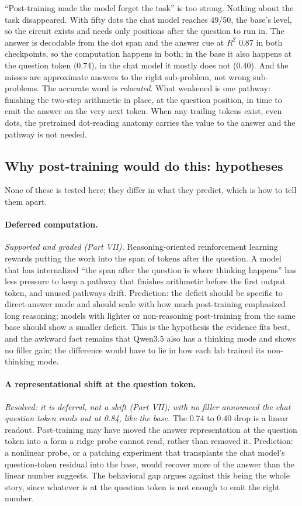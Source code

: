 \documentclass[11pt]{article}
\begin{document}
``Post-training made the model forget the task'' is too strong. Nothing about the task disappeared. With fifty dots the chat model reaches 49/50, the base's level, so the circuit exists and needs only positions after the question to run in. The answer is decodable from the dot span and the answer cue at $R^2$ 0.87 in both checkpoints, so the computation happens in both; in the base it also happens at the question token (0.74), in the chat model it mostly does not (0.40). And the misses are approximate answers to the right sub-problem, not wrong sub-problems. The accurate word is \emph{relocated}. What weakened is one pathway: finishing the two-step arithmetic in place, at the question position, in time to emit the answer on the very next token. When any trailing tokens exist, even dots, the pretrained dot-reading anatomy carries the value to the answer and the pathway is not needed.

\subsection{Why post-training would do this: hypotheses}

None of these is tested here; they differ in what they predict, which is how to tell them apart.

\paragraph{Deferred computation.} \emph{Supported and graded (Part VII).} Reasoning-oriented reinforcement learning rewards putting the work into the span of tokens after the question. A model that has internalized ``the span after the question is where thinking happens'' has less pressure to keep a pathway that finishes arithmetic before the first output token, and unused pathways drift. Prediction: the deficit should be specific to direct-answer mode and should scale with how much post-training emphasized long reasoning; models with lighter or non-reasoning post-training from the same base should show a smaller deficit. This is the hypothesis the evidence fits best, and the awkward fact remains that Qwen3.5 also has a thinking mode and shows no filler gain; the difference would have to lie in how each lab trained its non-thinking mode.

\paragraph{A representational shift at the question token.} \emph{Resolved: it is deferral, not a shift (Part VII); with no filler announced the chat question token reads out at 0.84, like the base.} The 0.74 to 0.40 drop is a linear readout. Post-training may have moved the answer representation at the question token into a form a ridge probe cannot read, rather than removed it. Prediction: a nonlinear probe, or a patching experiment that transplants the chat model's question-token residual into the base, would recover more of the answer than the linear number suggests. The behavioral gap argues against this being the whole story, since whatever is at the question token is not enough to emit the right number.
\end{document}

